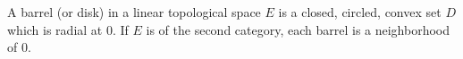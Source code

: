 A barrel (or disk) in a linear topological space $E$ is a closed, circled, convex set $D$ which is radial at 0. If $E$ is of the second category, each barrel is a neighborhood of 0.
